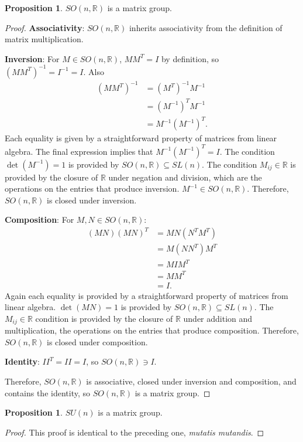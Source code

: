 \documentclass[12pt]{article}
\newcommand{\R}{\mathbb{R}}
\newcommand{\sun}{SU (n)}
\newcommand{\son}{SO (n, \R)}
\theoremstyle{definition}
\newtheorem{prop}[them]{Proposition}
\theoremstyle{definition}
\theoremstyle{definition}
\theoremstyle{definition}
\theoremstyle{definition}
\theoremstyle{definition}
\theoremstyle{definition}
\theoremstyle{definition}
\begin{document}
\begin{prop}
$\son$ is a matrix group.
\end{prop}
\begin{proof}
\par{\textbf{Associativity}: $\son$ inherits associativity from the definition of matrix multiplication.}

\par{\textbf{Inversion}: For $M \in \son$, $MM^T = I$ by definition,
so ${(MM^T)}^{-1} = I^{-1} = I$. Also
\[
\begin{aligned}
    {(MM^T)}^{-1} & = {(M^T)}^{-1}M^{-1} \\ 
    & = {(M^{-1})}^T M^{-1} \\ 
    & = M^{-1}{(M^{-1})}^T.
\end{aligned}
\] 
Each equality is given by a straightforward
property of matrices from linear algebra. The
final expression implies that $M^{-1}{(M^{-1})}^T
= I$. The condition $\det(M^{-1}) = 1$ is provided by $\son
\subseteq SL(n)$. The condition $M_{ij} \in \R$ is
provided by the closure of $\R$ under negation and
division, which are the operations on the entries
that produce inversion. $M^{-1} \in \son$.
Therefore, $\son$ is closed under inversion.}

\par{\textbf{Composition}: For $M, N \in \son$:
\[
\begin{aligned}
    (MN){(MN)}^{T} & = MN(N^{T}M^{T}) \\
    & = M(NN^T)M^T \\ 
    & = MIM^T \\ 
    & = MM^T \\ 
    & = I.
\end{aligned}
\] 
Again each equality is provided by a
straightforward property of matrices from linear
algebra. $\det(MN) = 1$ is provided by $\son
\subseteq SL(n)$. The $M_{ij} \in \R$ condition is
provided by the closure of $\R$ under addition and
multiplication, the operations on the entries that
produce composition. Therefore, $\son$ is closed
under composition.}

\par{\textbf{Identity}: $II^T = II = I$, so $\son
\ni I$.}

\par{Therefore, $\son$ is associative, closed under inversion and composition, and contains the identity, so $\son$ is a matrix group.}
\end{proof}

\begin{prop}
$\sun$ is a matrix group.
\end{prop}
\begin{proof}
This proof is identical to the preceding one,
\textit{mutatis mutandis}. 
\end{proof}
\end{document}
